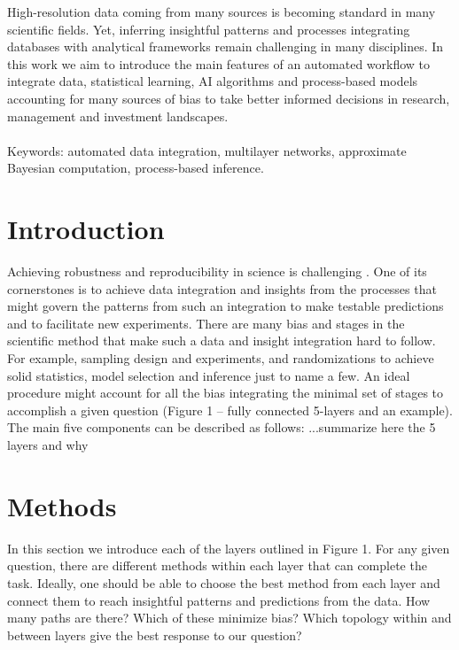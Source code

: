 \documentclass[english,12pt]{article}
\begin{document}
High-resolution data coming from many sources is becoming standard in
many scientific fields. Yet, inferring insightful patterns and
processes integrating databases with analytical frameworks remain
challenging in many disciplines. In this work we aim to introduce the
main features of an automated workflow to integrate data, statistical
learning, AI algorithms and process-based models accounting for many
sources of bias to take better informed decisions in research,
management and investment landscapes.
\\
\\
Keywords: automated data integration, multilayer networks, approximate
Bayesian computation, process-based inference.
\newpage


\section{Introduction}

Achieving robustness and reproducibility in science is challenging
\citep{Ioannidis:2005}. One of its cornerstones is to achieve data
integration and insights from the processes that might govern the
patterns from such an integration to make testable predictions and to
facilitate new experiments. There are many bias and stages in the
scientific method that make such a data and insight integration hard
to follow. For example, sampling design and experiments,  and randomizations to achieve solid statistics, model
selection and inference just to name a few. An ideal procedure might
account for all the bias integrating the minimal set of stages to
accomplish a given question (Figure 1 -- fully connected 5-layers and
an example).
\\

The main five components can be described as follows: 
...summarize here the 5 layers and why
\\


\section{Methods}

In this section we introduce each of the layers outlined in Figure
1. For any given question, there are different methods within each
layer that can complete the task. Ideally, one should be able to
choose the best method from each layer and connect them to reach
insightful patterns and predictions from the data. How many paths are
there? Which of these minimize bias? Which topology within and between
layers give the best response to our question?
\end{document}
